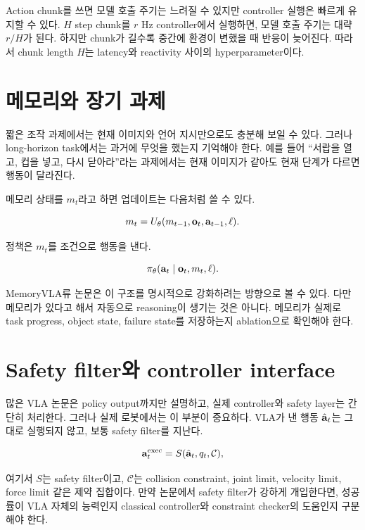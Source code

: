 Action chunk를 쓰면 모델 호출 주기는 느려질 수 있지만 controller 실행은 빠르게 유지할 수 있다. $H$ step chunk를 $r$ Hz controller에서 실행하면, 모델 호출 주기는 대략 $r/H$가 된다. 하지만 chunk가 길수록 중간에 환경이 변했을 때 반응이 늦어진다. 따라서 chunk length $H$는 latency와 reactivity 사이의 hyperparameter이다.

\section{메모리와 장기 과제}

짧은 조작 과제에서는 현재 이미지와 언어 지시만으로도 충분해 보일 수 있다. 그러나 long-horizon task에서는 과거에 무엇을 했는지 기억해야 한다. 예를 들어 ``서랍을 열고, 컵을 넣고, 다시 닫아라''라는 과제에서는 현재 이미지가 같아도 현재 단계가 다르면 행동이 달라진다.

메모리 상태를 $m_t$라고 하면 업데이트는 다음처럼 쓸 수 있다.

\begin{equation}
  m_t =
  U_\theta(m_{t-1}, \mathbf{o}_t, \mathbf{a}_{t-1}, \ell).
  \label{eq:memory_update}
\end{equation}

정책은 $m_t$를 조건으로 행동을 낸다.

\begin{equation}
  \pi_\theta(\mathbf{a}_t \mid \mathbf{o}_t, m_t, \ell).
\end{equation}

MemoryVLA류 논문은 이 구조를 명시적으로 강화하려는 방향으로 볼 수 있다. 다만 메모리가 있다고 해서 자동으로 reasoning이 생기는 것은 아니다. 메모리가 실제로 task progress, object state, failure state를 저장하는지 ablation으로 확인해야 한다.

\section{Safety filter와 controller interface}

많은 VLA 논문은 policy output까지만 설명하고, 실제 controller와 safety layer는 간단히 처리한다. 그러나 실제 로봇에서는 이 부분이 중요하다. VLA가 낸 행동 $\hat{\mathbf{a}}_t$는 그대로 실행되지 않고, 보통 safety filter를 지난다.

\begin{equation}
  \mathbf{a}_t^{\mathrm{exec}}
  =
  S(\hat{\mathbf{a}}_t, q_t, \mathcal{C}),
  \label{eq:safety_filter}
\end{equation}

여기서 $S$는 safety filter이고, $\mathcal{C}$는 collision constraint, joint limit, velocity limit, force limit 같은 제약 집합이다. 만약 논문에서 safety filter가 강하게 개입한다면, 성공률이 VLA 자체의 능력인지 classical controller와 constraint checker의 도움인지 구분해야 한다.

